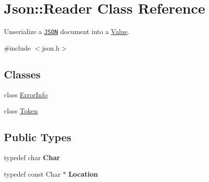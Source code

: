 \hypertarget{class_json_1_1_reader}{\section{Json\-:\-:Reader Class Reference}
\label{class_json_1_1_reader}
}


Unserialize a \href{http://www.json.org}{\tt J\-S\-O\-N} document into a \hyperlink{class_json_1_1_value}{Value}.  




{\ttfamily \#include $<$json.\-h$>$}

\subsection*{Classes}
\begin{DoxyCompactItemize}
\item 
class \hyperlink{class_json_1_1_reader_1_1_error_info}{Error\-Info}
\item 
class \hyperlink{class_json_1_1_reader_1_1_token}{Token}
\end{DoxyCompactItemize}
\subsection*{Public Types}
\begin{DoxyCompactItemize}
\item 
\hypertarget{class_json_1_1_reader_a3eec9118f3e9a672ba8348c3a79d0f45}{typedef char {\bfseries Char}}\label{class_json_1_1_reader_a3eec9118f3e9a672ba8348c3a79d0f45}

\item 
\hypertarget{class_json_1_1_reader_a46795b5b272bf79a7730e406cb96375a}{typedef const Char $\ast$ {\bfseries Location}}\label{class_json_1_1_reader_a46795b5b272bf79a7730e406cb96375a}

\end{DoxyCompactItemize}
